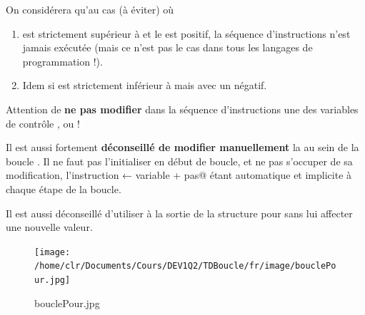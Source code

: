 \documentclass[11pt,a4paper]{article}
\begin{document}
            \par
        
        On consid\'erera qu'au cas (\`a \'eviter) o\`u
        
					\begin{enumerate}
				
			\item {} est strictement sup\'erieur \`a \verb@fin@ 
            et le \verb@pas@ est positif, la s\'equence d'instructions n'est
            jamais ex\'ecut\'ee (mais ce n'est pas le cas dans tous les langages de programmation !). 
          
			\item 
            Idem si  est strictement inf\'erieur \`a \verb@fin@ 
            mais avec un \verb@pas@ n\'egatif.
          
					\end{enumerate}
				
            \par
        
        Attention de \textbf{ne pas modifier} dans la s\'equence d'instructions une des variables de contr\^ole
        , \verb@fin@ ou \verb@pas@ ! 
      
            \par
        
        Il est aussi fortement \textbf{d\'econseill\'e de modifier \guillemotleft  manuellement }\guillemotright  
        la \verb@variable@ 
        au sein de la boucle \verb@pour@. 
        Il ne faut pas l'initialiser en d\'ebut de boucle, et ne pas s'occuper de sa modification,
         l'instruction \verb@variable ← variable + pas@ \'etant automatique
        et implicite \`a chaque \'etape de la boucle. 
      
            \par
        
        Il est aussi d\'econseill\'e d'utiliser \verb@variable@ \`a la sortie
        de la structure pour sans lui affecter une nouvelle valeur.
      
            \par
        \begin{figure}[hbt]
				    \begin{center}
					\texttt{[image: /home/clr/Documents/Cours/DEV1Q2/TDBoucle/fr/image/bouclePour.jpg]}
						\end{center}
                
                    \caption[bouclePour.jpg]{bouclePour.jpg}
                \end{figure}
                    
\end{document}
